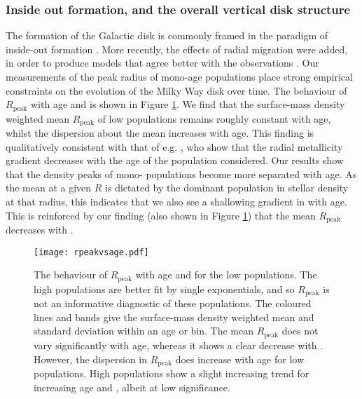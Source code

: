 \subsubsection{Inside out formation, and the overall vertical disk structure}
The formation of the Galactic disk is commonly framed in the paradigm of inside-out formation \citep[e.g.,][]{2013ApJ...773...43B,2011ApJ...729...16K,1976MNRAS.176...31L,1989MNRAS.239..885M}. More recently, the effects of radial migration  \citep[e.g.][]{2002MNRAS.336..785S} were added, in order to produce models that agree better with the observations \citep[e.g.][]{2011ApJ...737....8L,2009MNRAS.396..203S,2015ApJ...802..129S,2015A&A...580A.126K} . Our measurements of the peak radius of mono-age populations place strong empirical constraints on the evolution of the Milky Way disk over time. The behaviour of $R_{\mathrm{peak}}$ with age and \feh{} is shown in Figure \ref{fig:rpeakvsage}. We find that the surface-mass density weighted mean $R_{\mathrm{peak}}$ of low \afe{} populations remains roughly constant with age, whilst the dispersion about the mean increases with age. This finding is qualitatively consistent with that of e.g. \citet{2016arXiv160804951A}, who show that the radial metallicity gradient decreases with the age of the population considered. Our results show that the density peaks of mono-\feh{} populations become more separated with age. As the mean \feh{} at a given $R$ is dictated by the dominant population in stellar density at that radius, this indicates that we also see a shallowing gradient in \feh{} with age. This is reinforced by our finding (also shown in Figure \ref{fig:rpeakvsage}) that the mean $R_{\mathrm{peak}}$ decreases with \feh{}.

\begin{figure}
	\texttt{[image: rpeakvsage.pdf]}
	\centering
   \caption{The behaviour of $R_{\mathrm{peak}}$ with age and \feh{} for the low \afe{} populations. The high \afe{} populations are better fit by single exponentials, and so $R_{\mathrm{peak}}$ is not an informative diagnostic of these populations. The coloured lines and bands give the surface-mass density weighted mean and standard deviation within an age or \feh{} bin. The mean $R_{\mathrm{peak}}$ does not vary significantly with age, whereas it shows a clear decrease with \feh{}. However, the dispersion in $R_{\mathrm{peak}}$ does increase with age for low \afe{} populations. High \afe{} populations show a slight increasing trend for increasing age and \feh{}, albeit at low significance. }
    \label{fig:rpeakvsage}
\end{figure}


